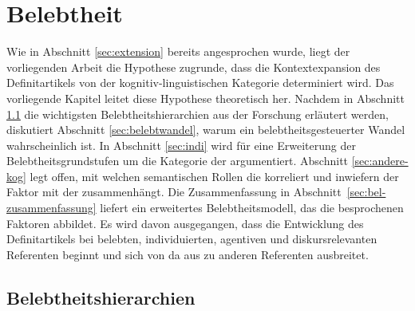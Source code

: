 \chapter{Belebtheit} \label{chapter:belebtheit}

Wie in Abschnitt \ref{sec:extension} bereits angesprochen wurde, liegt der vorliegenden Arbeit  die Hypothese zugrunde, dass die Kontextexpansion  des Definitartikels  von der kognitiv-linguistischen Kategorie  determiniert wird. Das vorliegende Kapitel leitet diese Hypothese theoretisch her. Nachdem in Abschnitt \ref{sec:belebt} die wichtigsten Belebtheitshierarchien  aus der Forschung erläutert werden, diskutiert Abschnitt \ref{sec:belebtwandel}, warum ein belebtheitsgesteuerter  Wandel wahrscheinlich ist. In Abschnitt \ref{sec:indi} wird für eine Erweiterung der Belebtheitsgrundstufen um die Kategorie der  argumentiert. Abschnitt \ref{sec:andere-kog} legt offen, mit welchen semantischen Rollen  die  korreliert und inwiefern der Faktor  mit der  zusammenhängt. Die Zusammenfassung in Abschnitt~\ref{sec:bel-zusammenfassung} liefert ein erweitertes Belebtheitsmodell, das die besprochenen Faktoren abbildet. Es wird davon ausgegangen, dass die Entwicklung des Definitartikels  bei  belebten,  individuierten,  agentiven und diskursrelevanten Referenten beginnt und sich von da aus zu anderen Referenten ausbreitet. 

\section{Belebtheitshierarchien}\label{sec:belebt}

